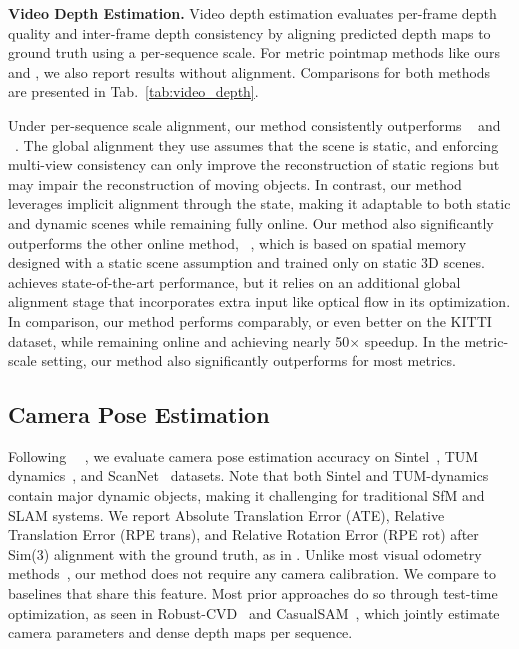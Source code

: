 \vspace{0.5em}\noindent\textbf{Video Depth Estimation.}
Video depth estimation evaluates per-frame depth quality and inter-frame depth consistency by aligning predicted depth maps to ground truth using a per-sequence scale. 
For metric pointmap methods like ours and \master{}, we also report results without alignment. 
Comparisons for both methods are presented in Tab.~\ref{tab:video_depth}.

Under per-sequence scale alignment,
our method consistently outperforms \duster{}~\cite{wang2024dust3r} and \master{}~\cite{leroy2024mast3r}. The global alignment they use assumes that the scene is static, and enforcing multi-view consistency can only improve the reconstruction of static regions but may impair the reconstruction of moving objects. In contrast, our method leverages implicit alignment through the state, making it adaptable to both static and dynamic scenes while remaining fully online. Our method also significantly outperforms the other online method, \spanner{}~\cite{spann3r}, which is based on spatial memory designed with a static scene assumption and trained only on static 3D scenes.
\monster{}~\cite{zhang2024monst3r} achieves state-of-the-art performance, but it relies on an additional global alignment stage that incorporates extra input like optical flow in its optimization. In comparison, our method performs comparably, or even better on the KITTI dataset, while remaining online and achieving nearly 50$\times$ speedup. 
In the metric-scale setting, our method also significantly outperforms \master{} for most metrics.





\subsection{Camera Pose Estimation}
\label{sec:exp_pose}



Following ~\monster{}~\cite{zhang2024monst3r}, we evaluate camera pose estimation accuracy on Sintel~\cite{sintel}, TUM dynamics~\cite{tum-dynamics}, and ScanNet~\cite{dai2017scannet} datasets. Note that both Sintel and TUM-dynamics contain major dynamic objects, making it challenging for traditional SfM and SLAM systems.
We report Absolute Translation Error (ATE), Relative Translation Error (RPE trans), and Relative Rotation Error (RPE rot) after Sim(3) alignment with the ground truth, as in \cite{chen2024leap,zhao2022particlesfm,zhang2024monst3r}. Unlike most visual odometry methods~\cite{chen2024leap,he2016deep,teed2021droid}, our method does not require any camera calibration. 
We compare to baselines that share this feature.
Most prior approaches do so through test-time optimization, as seen in Robust-CVD~\cite{robustcvd} and CasualSAM~\cite{casualsam}, which jointly estimate camera parameters and dense depth maps per sequence. 

